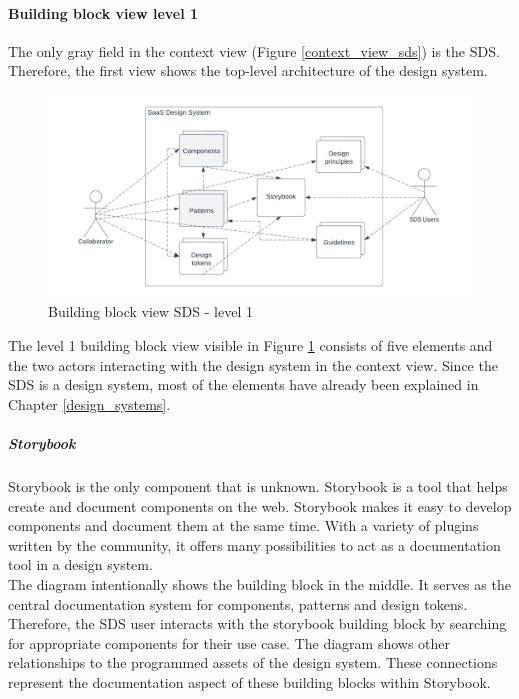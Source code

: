 \paragraph{Building block view level 1}
The only gray field in the context view (Figure \ref{context_view_sds}) is the \acl{SDS}. Therefore, the first view shows the top-level architecture of the design system. \\
\begin{figure}[htbp]
    \centerline{
    \includegraphics[width=\linewidth]{images/building_block_view_level_1.png}}
\caption{Building block view \ac{SDS} - level 1}
\label{building_block_level_1_sds}
\end{figure}
The level 1 building block view visible in Figure \ref{building_block_level_1_sds} consists of five elements and the two actors interacting with the design system in the context view. Since the SDS is a design system, most of the elements have already been explained in Chapter \ref{design_systems}.\\

\subparagraph{Storybook}
Storybook is the only component that is unknown. Storybook is a tool that helps create and document components on the web. Storybook makes it easy to develop components and document them at the same time. With a variety of plugins written by the community, it offers many possibilities to act as a documentation tool in a design system. \cite{storybook_storybook_nodate}\\
The diagram intentionally shows the building block in the middle. It serves as the central documentation system for components, patterns and design tokens. Therefore, the SDS user interacts with the storybook building block by searching for appropriate components for their use case. The diagram shows other relationships to the programmed assets of the design system. These connections represent the documentation aspect of these building blocks within Storybook.\\

